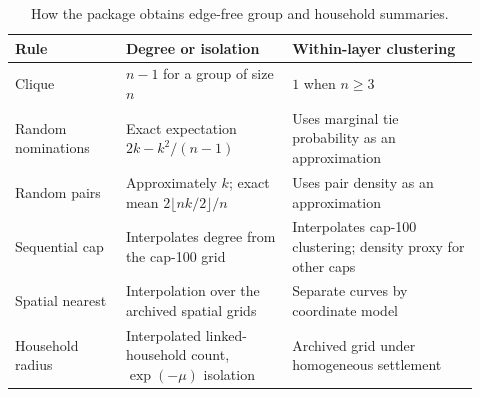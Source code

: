 \begin{table}[!htbp]
\centering\small
\caption{How the package obtains edge-free group and household summaries.}
\label{tab:theory}
\begin{tabular}{@{} >{\raggedright\arraybackslash}p{0.22\linewidth} >{\raggedright\arraybackslash}p{0.33\linewidth} >{\raggedright\arraybackslash}p{0.37\linewidth} @{}}
\toprule
\rowcolor{tableblue} \textbf{Rule} & \textbf{Degree or isolation} & \textbf{Within-layer clustering} \\
\midrule
Clique & $n-1$ for a group of size $n$ & $1$ when $n\geq3$ \\
Random nominations & Exact expectation $2k-k^2/(n-1)$ & Uses marginal tie probability as an approximation \\
Random pairs & Approximately $k$; exact mean $2\lfloor nk/2\rfloor/n$ & Uses pair density as an approximation \\
Sequential cap & Interpolates degree from the cap-100 grid & Interpolates cap-100 clustering; density proxy for other caps \\
Spatial nearest & Interpolation over the archived spatial grids & Separate curves by coordinate model \\
Household radius & Interpolated linked-household count, $\exp(-\mu)$ isolation & Archived grid under homogeneous settlement \\
\bottomrule
\end{tabular}
\end{table}
